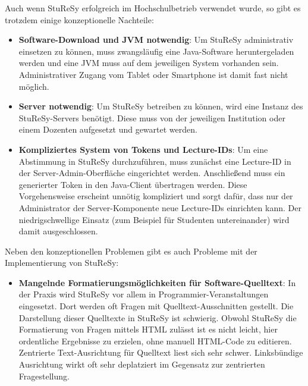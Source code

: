 Auch wenn StuReSy erfolgreich im Hochschulbetrieb verwendet wurde, so gibt es trotzdem einige konzeptionelle Nachteile:
\begin{itemize}
    \item \textbf{Software-Download und JVM notwendig}: Um StuReSy administrativ einsetzen zu können, muss zwangsläufig eine Java-Software heruntergeladen werden und eine JVM muss auf dem jeweiligen System vorhanden sein. Administrativer Zugang vom Tablet oder Smartphone ist damit fast nicht möglich.
    \item \textbf{Server notwendig}: Um StuReSy betreiben zu können, wird eine Instanz des StuReSy-Servers benötigt. Diese muss von der jeweiligen Institution oder einem Dozenten aufgesetzt und gewartet werden.
    \item \textbf{Kompliziertes System von Tokens und Lecture-IDs}: Um eine Abstimmung in StuReSy durchzuführen, muss zunächst eine Lecture-ID in der Server-Admin-Oberfläche eingerichtet werden. Anschließend muss ein generierter Token in den Java-Client übertragen werden. Diese Vorgehensweise erscheint unnötig kompliziert und sorgt dafür, dass nur der Administrator der Server-Komponente neue Lecture-IDs einrichten kann. Der niedrigschwellige Einsatz (zum Beispiel für Studenten untereinander) wird damit ausgeschlossen.
\end{itemize}

Neben den konzeptionellen Problemen gibt es auch Probleme mit der Implementierung von StuReSy:
\begin{itemize}
\item \textbf{Mangelnde Formatierungsmöglichkeiten für Software-Quelltext}: In der Praxis wird StuReSy vor allem in Programmier-Veranstaltungen eingesetzt. Dort werden oft Fragen mit Quelltext-Ausschnitten gestellt. Die Darstellung dieser Quelltexte in StuReSy ist schwierig. Obwohl StuReSy die Formatierung von Fragen mittels HTML zulässt ist es nicht leicht, hier ordentliche Ergebnisse zu erzielen, ohne manuell HTML-Code zu editieren. Zentrierte Text-Ausrichtung für Quelltext liest sich sehr schwer. Linksbündige Ausrichtung wirkt oft sehr deplatziert im Gegensatz zur zentrierten Fragestellung.
\end{itemize}

